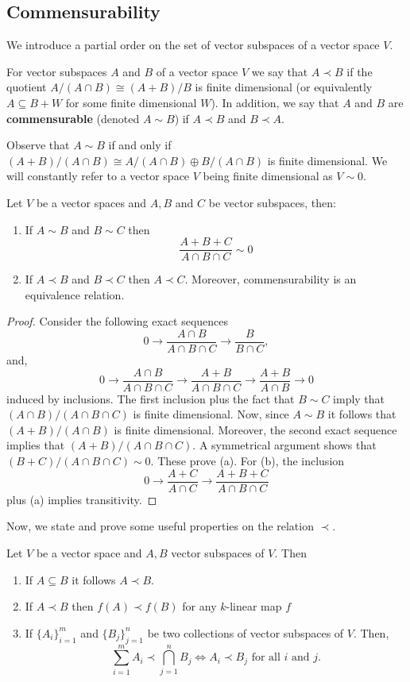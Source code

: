 \subsection*{Commensurability}
We introduce a partial order on the set of vector subspaces of a vector space $V$.
\begin{definition}\label{def:commensurability}
	For vector subspaces $A$ and $B$ of a vector space $V$ we say that $A \prec B$ if the quotient $A/(A\cap B) \cong (A+B)/B$ is finite dimensional (or equivalently $A \subseteq B + W$ for some finite dimensional $W$). In addition, we say that $A$ and $B$ are \textbf{commensurable} (denoted $A \sim B$) if $A \prec B$ and $B \prec A$.
\end{definition}
Observe that $A \sim B$ if and only if $(A+B)/(A\cap B) \cong A/(A\cap B) \oplus B/(A \cap B)$ is finite dimensional. We will constantly refer to a vector space $V$ being finite dimensional as $V \sim 0$.
\begin{proposition}\label{prop:equivalence-relation}
	Let $V$ be a vector spaces and $A,B$ and $C$ be vector subspaces, then:
	\begin{enumerate}[label = (\alph*)]
		\item If $A \sim B$ and $B \sim C$ then
		\[
			\frac{A+B+C}{A \cap B \cap C} \sim 0
		\]
		\item If $A \prec B$ and $B \prec C$ then $A \prec C$. Moreover, commensurability is an equivalence relation.
	\end{enumerate}
\end{proposition}
\begin{proof}
	Consider the following exact sequences
	\[
		0 \to \frac{A\cap B}{A \cap B \cap C} \to \frac{B}{B \cap C}, 
	\]
	and,
	\[
		0 \to \frac{A\cap B}{A \cap B \cap C} \to \frac{A+B}{A \cap B \cap C}
		\to \frac{A+B}{A \cap B} \to 0
	\]
	induced by inclusions. The first inclusion plus the fact that $B \sim C$ imply that $(A\cap B)/(A \cap B \cap C)$ is finite dimensional. Now, since $A \sim B$ it follows that $(A+B)/(A \cap B)$ is finite dimensional. Moreover, the second exact sequence implies that $(A+B)/(A \cap B \cap C)$. A symmetrical argument shows that $(B+C)/(A \cap B \cap C) \sim 0$. These prove (a). For (b), the inclusion
	\[
		0 \to \frac{A+C}{A\cap C} \to \frac{A+B+C}{A \cap B \cap C}
	\]
	plus (a) implies transitivity. 
\end{proof}
Now, we state and prove some useful properties on the relation $\prec$.
\begin{lemma}\label{lemm:properties-order-well-behaved-under-operations}
Let $V$ be a vector space and $A,B$ vector subspaces of $V$. Then
\begin{enumerate}[label = (\alph*)]
	\item If $A \subseteq B$ it follows $A \prec B$.
	\item If $A \prec B$ then $f(A) \prec f(B)$ for any $k$-linear map $f$
	\item If $\{A_{i}\}_{i=1}^{m}$ and $\{B_{j}\}_{j=1}^{n}$ be two collections of vector subspaces of $V$. Then,
	\[
		\sum_{i=1}^{m} A_{i} \prec \bigcap_{j=1}^{n} B_{j} \iff A_{i} \prec B_{j}\text{ for all } i \text{ and } j.
	\]
\end{enumerate}
\end{lemma}
